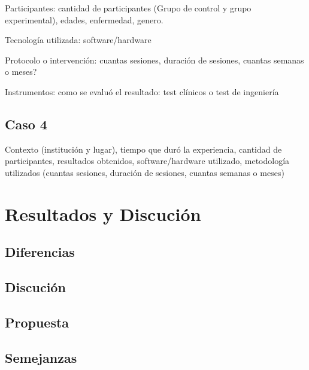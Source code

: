 \documentclass[journal]{IEEEtran}
\begin{document}
Participantes: cantidad de participantes (Grupo de control y grupo experimental), edades, enfermedad, genero.

Tecnología utilizada: software/hardware 

Protocolo o intervención: cuantas sesiones, duración de sesiones, cuantas semanas o meses?

Instrumentos: como se evaluó el resultado: test clínicos o test de ingeniería 


\subsection{Caso 4}
Contexto (institución y lugar), tiempo que duró la experiencia, cantidad de participantes, resultados obtenidos, software/hardware utilizado, metodología utilizados (cuantas sesiones, duración de sesiones, cuantas semanas o meses) 

\section{Resultados y Discución}
\subsection{Diferencias}
\subsection{Discución}
\subsection{Propuesta}
\subsection{Semejanzas}






\balance






\end{document}

